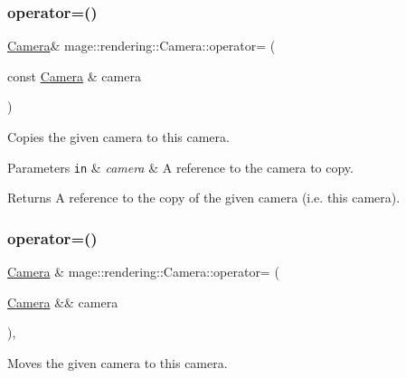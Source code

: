 \subsubsection{\texorpdfstring{operator=()}{operator=()}\hspace{0.1cm}{\footnotesize\ttfamily [1/2]}}
{\footnotesize\ttfamily \mbox{\hyperlink{classmage_1_1rendering_1_1_camera}{Camera}}\& mage\+::rendering\+::\+Camera\+::operator= (\begin{DoxyParamCaption}\item[{const \mbox{\hyperlink{classmage_1_1rendering_1_1_camera}{Camera}} \&}]{camera }\end{DoxyParamCaption})\hspace{0.3cm}{\ttfamily [delete]}}

Copies the given camera to this camera.


\begin{DoxyParams}[1]{Parameters}
\mbox{\tt in}  & {\em camera} & A reference to the camera to copy. \\
\hline
\end{DoxyParams}
\begin{DoxyReturn}{Returns}
A reference to the copy of the given camera (i.\+e. this camera). 
\end{DoxyReturn}
\mbox{\label{classmage_1_1rendering_1_1_camera_a61b594df300888d8d442855d18b871a3}} 
\subsubsection{\texorpdfstring{operator=()}{operator=()}\hspace{0.1cm}{\footnotesize\ttfamily [2/2]}}
{\footnotesize\ttfamily \mbox{\hyperlink{classmage_1_1rendering_1_1_camera}{Camera}} \& mage\+::rendering\+::\+Camera\+::operator= (\begin{DoxyParamCaption}\item[{\mbox{\hyperlink{classmage_1_1rendering_1_1_camera}{Camera}} \&\&}]{camera }\end{DoxyParamCaption})\hspace{0.3cm}{\ttfamily [default]}, {\ttfamily [noexcept]}}

Moves the given camera to this camera.


